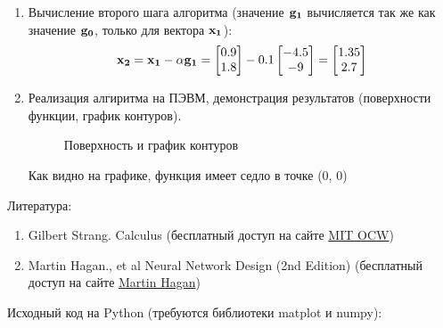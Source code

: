 \documentclass[a4paper]{report}
\begin{document}
\begin{enumerate}
    \item Вычисление второго шага алгоритма (значение ${\bf g_1}$ вычисляется так же как значение ${\bf g_0}$, только для вектора ${\bf x_1}$):
        \begin{eqnarray}
            {\bf x_2} = {\bf x_1} - \alpha {\bf g_1} = 
                \left[
                \begin{matrix}
                    0.9 \\
                    1.8
                \end{matrix}
                \right]
                - 0.1
                \left[
                \begin{matrix}
                    -4.5 \\
                    -9
                \end{matrix}
                \right]
                =
                \left[
                \begin{matrix}
                    1.35 \\
                    2.7 
                \end{matrix}
                \right]
        \end{eqnarray}
    
    \item Реализация алгиритма на ПЭВМ, демонстрация результатов (поверхности функции, график контуров).
    \begin{figure}[h]
        \center{}
        \caption{Поверхность и график контуров} 
        \label{pic:graph}
    \end{figure}

    Как видно на графике, функция имеет седло в точке (0, 0)
\end{enumerate}

Литература:
\begin{enumerate}
    \item Gilbert Strang. Calculus (бесплатный доступ на сайте \href{http://ocw.mit.edu/ans7870/resources/Strang/Edited/Calculus/Calculus.pdf}{MIT OCW})
    \item Martin Hagan., et al Neural Network Design (2nd Edition) (бесплатный доступ на сайте \href{http://hagan.okstate.edu/nnd.html}{Martin Hagan})
\end{enumerate}

Исходный код на Python (требуются библиотеки matplot и numpy):
\lstset{language=Python,texcl=true}

\end{document}
